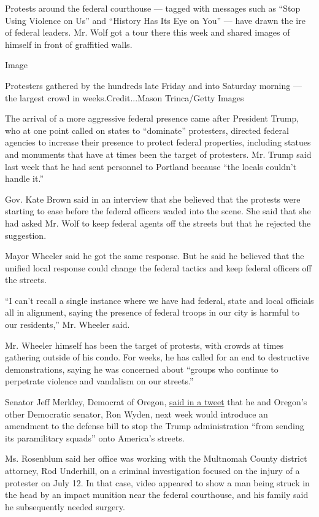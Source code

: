 Protests around the federal courthouse --- tagged with messages such as
``Stop Using Violence on Us'' and ``History Has Its Eye on You'' ---
have drawn the ire of federal leaders. Mr. Wolf got a tour there this
week and shared images of himself in front of graffitied walls.

Image

Protesters gathered by the hundreds late Friday and into Saturday
morning --- the largest crowd in weeks.Credit...Mason Trinca/Getty
Images

The arrival of a more aggressive federal presence came after President
Trump, who at one point called on states to ``dominate'' protesters,
directed federal agencies to increase their presence to protect federal
properties, including statues and monuments that have at times been the
target of protesters. Mr. Trump said last week that he had sent
personnel to Portland because ``the locals couldn't handle it.''

Gov. Kate Brown said in an interview that she believed that the protests
were starting to ease before the federal officers waded into the scene.
She said that she had asked Mr. Wolf to keep federal agents off the
streets but that he rejected the suggestion.

Mayor Wheeler said he got the same response. But he said he believed
that the unified local response could change the federal tactics and
keep federal officers off the streets.

``I can't recall a single instance where we have had federal, state and
local officials all in alignment, saying the presence of federal troops
in our city is harmful to our residents,'' Mr. Wheeler said.

Mr. Wheeler himself has been the target of protests, with crowds at
times gathering outside of his condo. For weeks, he has called for an
end to destructive demonstrations, saying he was concerned about
``groups who continue to perpetrate violence and vandalism on our
streets.''

Senator Jeff Merkley, Democrat of Oregon,
\href{https://twitter.com/SenJeffMerkley/status/1284560125483798529}{said
in a tweet} that he and Oregon's other Democratic senator, Ron Wyden,
next week would introduce an amendment to the defense bill to stop the
Trump administration ``from sending its paramilitary squads'' onto
America's streets.

Ms. Rosenblum said her office was working with the Multnomah County
district attorney, Rod Underhill, on a criminal investigation focused on
the injury of a protester on July 12. In that case, video appeared to
show a man being struck in the head by an impact munition near the
federal courthouse, and his family said he subsequently needed surgery.

